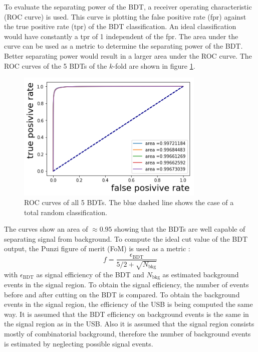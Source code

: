 To evaluate the separating power of the BDT, a receiver operating characteristic (ROC curve) is used.
This curve is plotting the false positive rate (fpr) against the true positive rate (tpr) of the BDT classification.
An ideal classification would have constantly a tpr of 1 independent of the fpr.
The area under the curve can be used as a metric to determine the separating power of the BDT.
Better separating power would result in a larger area under the ROC curve.
The ROC curves of the 5 BDTs of the $k$-fold are shown in figure \ref{fig:ROC}.
\begin{figure}[!htb]
  \centering
  \includegraphics[width=0.8\textwidth]{plots/ROC.png}
  \caption{ROC curves of all 5 BDTs. The blue dashed line shows the case of a total random classification.}
  \label{fig:ROC}
\end{figure}
The curves show an area of $\approx 0.95$ showing that the BDTs are well capable of separating signal from background.
To compute the ideal cut value of the BDT output, the Punzi figure of merit (FoM) is used as a metric \cite{Punzi}:
\begin{equation*}
  f = \frac{\epsilon_\text{BDT}}{5/2+\sqrt{N_\text{bkg}}}
\end{equation*}
with $\epsilon_\text{BDT}$ as signal efficiency of the BDT and $N_\text{bkg}$ as estimated background events in the signal region.
To obtain the signal efficiency, the number of events before and after cutting on the BDT is compared.
To obtain the background events in the signal region, the efficiency of the USB is being computed the same way.
It is assumed that the BDT efficiency on background events is the same in the signal region as in the USB.
Also it is assumed that the signal region consists mostly of combinatorial background, therefore the number of background events is estimated by neglecting possible signal events.

